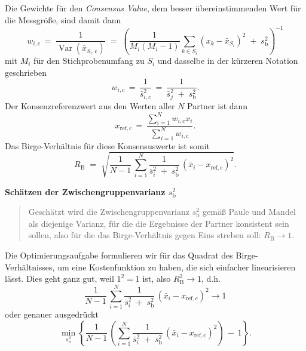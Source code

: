 Die Gewichte für den \textsl{Consensus Value}, dem besser übereinstimmenden
Wert für die Messgröße, sind damit dann
\begin{equation*}
w_{i,\mathrm{c}} \, = \; \frac{1}{\operatorname{Var}(\bar x_{S_i,\mathrm{c}})} \; = \;
\left(\frac{1}{M_i (M_i - 1)} \sum\limits_{k \in S_i}
\left( x_{k} - \bar x_{S_i} \right)^2
\; + \; s^2_\mathrm{b} \right)^{-1}
\end{equation*}
mit $M_i$ für den Stichprobenumfang zu $S_i$
und dasselbe in der kürzeren Notation geschrieben
\begin{equation}
w_{i,\mathrm{c}} \, = \, \frac{1}{\bar s^2_{i,\mathrm{c}}} \, = \, \frac{1}{\bar s^2_j \; + \; s^2_\mathrm{b}} .
\label{eq:consensusWeights}
\end{equation}
Der Konsenzreferenzwert aus den Werten aller $N$ Partner ist dann
\begin{equation}
x_\mathrm{ref, c} \, = \,
\frac{\sum\limits_{i=1}^N w_{i,\mathrm{c}} x_i}{\sum\limits_{i=1}^N w_{i,\mathrm{c}} }.
\label{eq:consensusMean}
\end{equation}
Das Birge-Verhältnis für diese Konsensuswerte ist somit
\begin{equation}
R_\mathrm{B} \; = \; \sqrt{ \frac{1}{N-1} \, \sum\limits_{i=1}^N
\frac{1}{\bar s^2_i \; + \; s^2_\mathrm{b}} \, \left(\bar x_i - x_\mathrm{ref, c}\right)^2}.
\end{equation}

\textbf{Schätzen der Zwischengruppenvarianz $s^2_\mathrm{b}$}
\begin{quote}
Geschätzt wird die Zwischengruppenvarianz $s^2_\mathrm{b}$ gemäß Paule und Mandel \cite{Pau82} als
diejenige Varianz, für die die Ergebnisse der Partner konsistent sein sollen, also für die
das Birge-Verhältnis gegen Eins streben soll: $R_\mathrm{B} \rightarrow 1$.
\end{quote}
Die Optimierungsaufgabe formulieren wir für das Quadrat des Birge-Verhältnisses,
um eine Kostenfunktion zu haben, die sich einfacher linearisieren lässt. Dies
geht ganz gut, weil $1^2 = 1$ ist, also $R^2_\mathrm{B} \rightarrow 1$, d.h.
\begin{equation*}
\frac{1}{N-1} \, \sum\limits_{i=1}^N
\frac{1}{\bar s^2_i \; + \; s^2_\mathrm{b}} \, \left(\bar x_i - x_\mathrm{ref, c}\right)^2 \rightarrow 1
\end{equation*}
oder genauer ausgedrückt
\begin{equation}
\min_{s^2_\mathrm{b}} \left\{\frac{1}{N-1} \, \left( \sum\limits_{i=1}^N
\frac{1}{\bar s^2_i \; + \; s^2_\mathrm{b}} \, \left(\bar x_i - x_\mathrm{ref, c}\right)^2  \right) \, - \, 1\right\}.
\label{eq:x_bet_Bedingung}
\end{equation}

